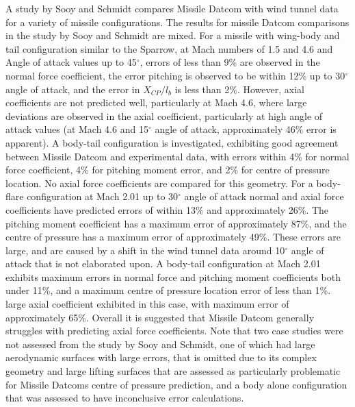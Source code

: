 A study by Sooy and Schmidt\cite{Sooy2005} compares Missile Datcom with wind tunnel data for a variety of missile configurations. 
The results for missile Datcom comparisons in the study by Sooy and Schmidt are mixed\cite{Sooy2005}.
For a missile with wing-body and tail configuration similar to the Sparrow, at Mach numbers of 1.5 and 4.6 and Angle of attack values up to 45$^\circ$, errors of less than 9\% are observed in the normal force coefficient, the error pitching is observed to be within 12\% up to 30$^\circ$ angle of attack, and the error in $X_{CP}/l_b$ is less than 2\%\cite{Sooy2005}. However, axial coefficients are not predicted well, particularly at Mach 4.6, where large deviations are observed in the axial coefficient, particularly at high angle of attack values (at Mach 4.6 and 15$^\circ$ angle of attack, approximately 46\% error is apparent\cite{Sooy2005}). 
A body-tail configuration is investigated, exhibiting good agreement between Missile Datcom and experimental data, with errors within 4\% for normal force coefficient, 4\% for pitching moment error, and 2\% for centre of pressure location. No axial force coefficients are compared for this geometry\cite{Sooy2005}.
For a body-flare configuration at Mach 2.01 up to 30$^\circ$ angle of attack normal and axial force coefficients have predicted errors of within 13\% and approximately 26\%. The pitching moment coefficient has a maximum error of approximately 87\%, and the centre of pressure has a maximum error of approximately 49\%\cite{Sooy2005}. These errors are large, and are caused by a shift in the wind tunnel data around 10$^\circ$ angle of attack that is not elaborated upon\cite{Sooy2005}. 
A body-tail configuration at Mach 2.01 exhibits maximum errors in normal force and pitching moment coefficients both under 11\%, and a maximum centre of pressure location error of less than 1\%\cite{Sooy2005}. 
large axial coefficient exhibited in this case, with maximum error of approximately 65\%\cite{Sooy2005}.
Overall it is suggested that Missile Datcom generally struggles with predicting axial force coefficients\cite{Sooy2005}.
Note that two case studies were not assessed from the study by Sooy and Schmidt, one of which had large aerodynamic surfaces with large errors, that is omitted due to its complex geometry and large lifting surfaces that are assessed as particularly problematic for Missile Datcoms centre of pressure prediction\cite{Sooy2005}, and a body alone configuration that was assessed to have inconclusive error calculations\cite{Sooy2005}. 


